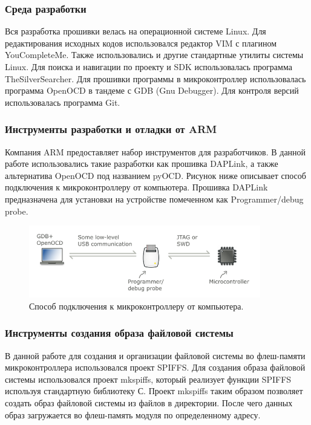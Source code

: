 \subsubsection{Среда разработки}
Вся разработка прошивки велась на операционной системе Linux. Для редактирования исходных кодов использовался редактор VIM с плагином YouCompleteMe. Также использовались и другие стандартные утилиты системы Linux. Для поиска и навигации по проекту и SDK использовалась программа TheSilverSearcher. Для прошивки программы в микроконтроллер использовалась программа OpenOCD в тандеме с GDB (Gnu Debugger). Для контроля версий использовалась программа Git.


\subsubsection{Инструменты разработки и отладки от ARM}
Компания ARM предоставляет набор инструментов для разработчиков. В данной работе использовались такие разработки как прошивка DAPLink, а также альтернатива OpenOCD под названием pyOCD.
Рисунок ниже описывает способ подключения к микроконтроллеру от компьютера. Прошивка DAPLink предназначена для установки на устройстве помеченном как Programmer/debug probe.

\begin{figure}[h!]
    \centering
    \includegraphics[width=0.9\textwidth]{pc_to_mcu.png}
    \caption{Способ подключения к микроконтроллеру от компьютера.}
\end{figure}


\subsubsection{Инструменты создания образа файловой системы}
В данной работе для создания и организации файловой системы во флеш-памяти микроконтроллера использовался проект SPIFFS.  Для создания образа файловой системы использовался проект mkspiffs, который реализует функции SPIFFS используя стандартную библиотеку С. Проект mkspiffs таким образом позволяет создать образ файловой системы из файлов в директории. После чего данных образ загружается во флеш-память модуля по определенному адресу.


